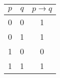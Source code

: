 \documentclass{article} %
\begin{document}
	
\begin{tabular}{|c|c|c|} \hline
	$p$ & $q$ & $p \rightarrow q$ \\ \hline
	0 & 0 & 1 \\
	0 & 1 & 1 \\ \cline{1-2}
	1 & 0 & 0 \\
	1 & 1 & 1 \\ \hline
\end{tabular}
\end{document}

